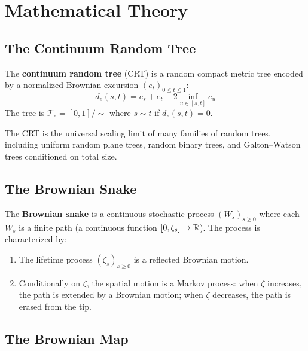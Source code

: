 \section{Mathematical Theory}

\subsection{The Continuum Random Tree}

\begin{definition}
The \textbf{continuum random tree} (CRT) is a random compact metric tree encoded by a normalized Brownian excursion $(e_t)_{0 \leq t \leq 1}$:
\[
d_e(s,t) = e_s + e_t - 2 \inf_{u \in [s,t]} e_u
\]
The tree is $\mathcal{T}_e = [0,1]/\sim$ where $s \sim t$ if $d_e(s,t) = 0$.
\end{definition}

\begin{theorem}
The CRT is the universal scaling limit of many families of random trees, including uniform random plane trees, random binary trees, and Galton--Watson trees conditioned on total size.
\end{theorem}

\subsection{The Brownian Snake}

\begin{definition}
The \textbf{Brownian snake} is a continuous stochastic process $(W_s)_{s \geq 0}$ where each $W_s$ is a finite path (a continuous function $[0,\zeta_s] \to \mathbb{R}$). The process is characterized by:
\begin{enumerate}
    \item The lifetime process $(\zeta_s)_{s \geq 0}$ is a reflected Brownian motion.
    \item Conditionally on $\zeta$, the spatial motion is a Markov process: when $\zeta$ increases, the path is extended by a Brownian motion; when $\zeta$ decreases, the path is erased from the tip.
\end{enumerate}
\end{definition}

\subsection{The Brownian Map}


